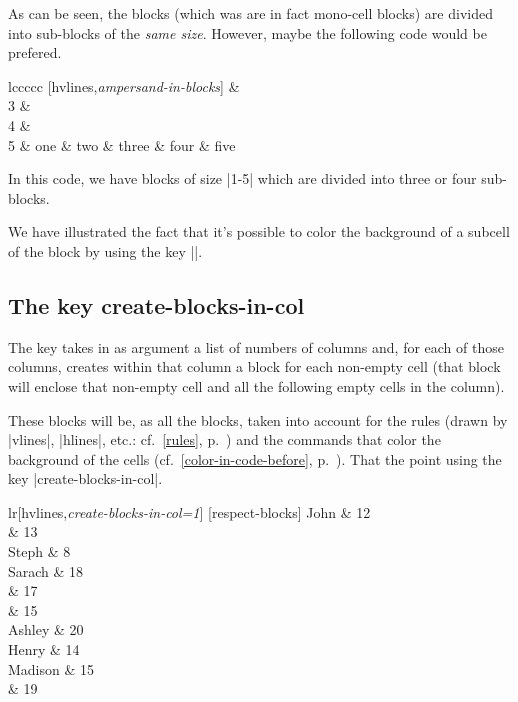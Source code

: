 \documentclass[dvipsnames]{article}
\begin{document}
As can be seen, the blocks (which was are in fact mono-cell blocks) are divided
into sub-blocks of the \emph{same size}. However, maybe the following code would
be prefered.

\medskip
\begin{Code}[width=90mm,show-output,no-cell-nodes]
\begin{NiceTabular}{lccccc}%
   [hvlines,\emph{ampersand-in-blocks}]
    &  \\ 
  3 &  \\
  4 &  \\
  5 & one & two & three & four & five \\
\end{NiceTabular}
\end{Code}

\medskip
In this code, we have blocks of size |1-5| which are divided into three or four
sub-blocks.

\smallskip
We have illustrated the fact that it's possible to color the background of a subcell
of the block by using the key |\cellcolor|.


\subsection{The key create-blocks-in-col}
\label{create-blocks-in-col}

The key  takes in as argument a list of numbers of columns
and, for each of those columns, creates within that column a block for each non-empty cell
(that block will enclose that non-empty cell and all the following empty cells in the column).

These blocks will be, as all the blocks, taken into account for the rules (drawn by |vlines|,
|hlines|, etc.: cf.~\ref{rules}, p.~\pageref{rules}) and the commands that color the
background of the cells (cf.~\ref{color-in-code-before}, p.~\pageref{color-in-code-before}).
That the point using the key |create-blocks-in-col|.

\bigskip
\begin{Code}[width=11cm,show-output]
\begin{NiceTabular}{lr}[hvlines,\emph{create-blocks-in-col=1}]
[respect-blocks]
  John      & 12 \\
            & 13 \\
  Steph     &  8 \\
  Sarach    & 18 \\
            & 17 \\
            & 15 \\
  Ashley    & 20 \\
  Henry     & 14 \\
  Madison   & 15 \\
            & 19
\end{NiceTabular}
\end{Code}
\end{document}
